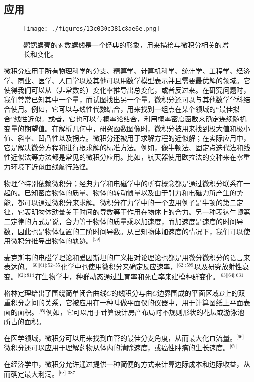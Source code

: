 \subsection{应用}
\begin{figure}[ht]
\centering
\texttt{[image: ./figures/13c030c381c8ae6e.png]}
\caption{鹦鹉螺壳的对数螺线是一个经典的形象，用来描绘与微积分相关的增长和变化。} \label{fig_Calcul_11}
\end{figure}
微积分应用于所有物理科学的分支、精算学、计算机科学、统计学、工程学、经济学、商业、医学、人口学以及其他可以用数学模型表示并且需要最优解的领域。它使得我们可以从（非常数的）变化率推导出总变化，或者反过来。在研究问题时，我们常常已知其中一个量，而试图找出另一个量。微积分还可以与其他数学学科结合使用。例如，它可以与线性代数结合，用来找到一组点在某个领域的“最佳拟合”线性近似。或者，它也可以与概率论结合，利用概率密度函数来确定连续随机变量的期望值。在解析几何中，研究函数图像时，微积分被用来找到极大值和极小值、斜率、凹凸性以及拐点。微积分还被用于求解方程的近似解；在实际应用中，它是解决微分方程和进行根求解的标准方法。例如，像牛顿法、固定点迭代法和线性近似法等方法都是常见的微积分应用。比如，航天器使用欧拉法的变种来在零重力环境下近似曲线航行路径。

物理学特别依赖微积分；经典力学和电磁学中的所有概念都是通过微积分联系在一起的。已知密度物体的质量、物体的转动惯量以及由于引力和电磁力所产生的势能，都可以通过微积分来求解。微积分在力学中的一个应用例子是牛顿的第二定律，它表明物体动量关于时间的导数等于作用在物体上的合力。另一种表达牛顿第二定律的方式是说，合力等于物体的质量乘以加速度，而加速度是速度的时间导数，因此也是物体位置的二阶时间导数。从已知物体加速度的情况下，我们可以使用微积分推导出物体的轨迹。\(^\text{[59]}\)

麦克斯韦的电磁学理论和爱因斯坦的广义相对论理论也都是用微分微积分的语言来表达的。\(^\text{[60][61]: 52–55 }\)化学中也使用微积分来确定反应速率，\(^\text{[62]: 599}\) 以及研究放射性衰变。\(^\text{[62]: 814 }\)在生物学中，种群动态通过生育率和死亡率来建模种群变化。\(^\text{[63][64]: 631 }\)

格林定理给出了围绕简单闭合曲线\(C\)的线积分与由\(C\)边界围成的平面区域\(D\)上的双重积分之间的关系，它被应用在一种叫做平面仪的仪器中，用于计算图纸上平面表面的面积。\(^\text{[65]}\)例如，它可以用于计算设计房产布局时不规则形状的花坛或游泳池所占的面积。

在医学领域，微积分可以用来找到血管的最佳分支角度，从而最大化血流量。\(^\text{[66]}\)微积分还可以应用于理解药物从体内的清除速度，或癌性肿瘤的生长速度。\(^\text{[67]}\)

在经济学中，微积分允许通过提供一种简便的方式来计算边际成本和边际收益，从而确定最大利润。\(^\text{[68]: 387 }\)
